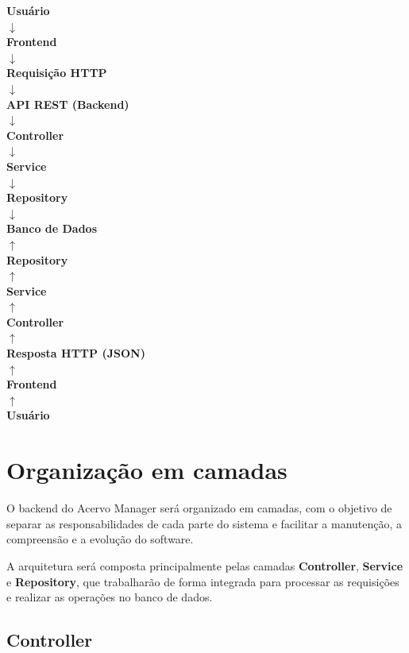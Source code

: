\documentclass[12pt,a4paper]{article}
\begin{document}
\begin{center}
\textbf{Usuário}\\
$\downarrow$\\
\textbf{Frontend}\\
$\downarrow$\\
\textbf{Requisição HTTP}\\
$\downarrow$\\
\textbf{API REST (Backend)}\\
$\downarrow$\\
\textbf{Controller}\\
$\downarrow$\\
\textbf{Service}\\
$\downarrow$\\
\textbf{Repository}\\
$\downarrow$\\
\textbf{Banco de Dados}\\
$\uparrow$\\
\textbf{Repository}\\
$\uparrow$\\
\textbf{Service}\\
$\uparrow$\\
\textbf{Controller}\\
$\uparrow$\\
\textbf{Resposta HTTP (JSON)}\\
$\uparrow$\\
\textbf{Frontend}\\
$\uparrow$\\
\textbf{Usuário}
\end{center}

\section{Organização em camadas}

O backend do Acervo Manager será organizado em camadas, com o objetivo de separar as responsabilidades de cada parte do sistema e facilitar a manutenção, a compreensão e a evolução do software.

A arquitetura será composta principalmente pelas camadas \textbf{Controller}, \textbf{Service} e \textbf{Repository}, que trabalharão de forma integrada para processar as requisições e realizar as operações no banco de dados.

\subsection{Controller}
\end{document}
